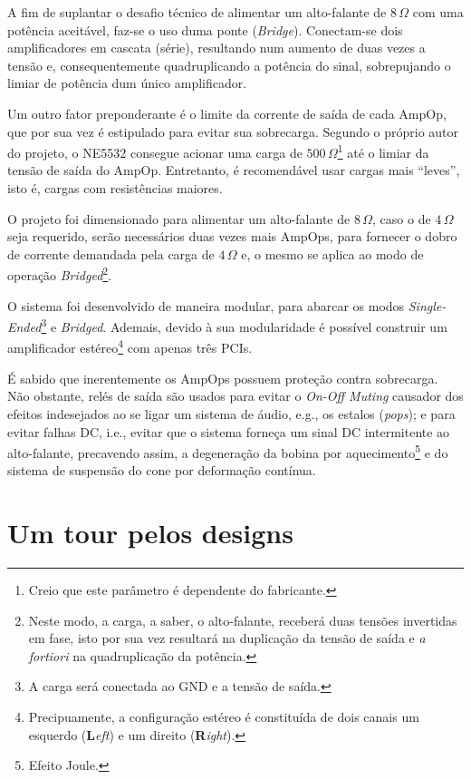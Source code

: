 \documentclass[12pt, a4paper, leqno, twoside]{book}
\def\ohm{\,\Omega}
\def\ampop{AmpOp}
\begin{document}
  A fim de suplantar o desafio t\'ecnico de alimentar um alto-falante de $8\ohm$ com uma pot\^encia aceit\'avel, faz-se o uso duma ponte ({\it Bridge}). Conectam-se dois amplificadores em cascata (s\'erie), resultando num aumento de duas vezes a tens\~ao e, consequentemente quadruplicando a pot\^encia do sinal, sobrepujando o limiar de pot\^encia dum \'unico amplificador. 

  Um outro fator preponderante \'e o limite da corrente de sa\'ida de cada \ampop, que por sua vez \'e estipulado para evitar sua sobrecarga. Segundo o pr\'oprio autor do projeto, o NE5532 consegue acionar uma carga de $500\ohm$\footnote{Creio que este par\^ametro \'e dependente do fabricante.} at\'e o limiar da tens\~ao de sa\'ida do \ampop. Entretanto, \'e recomend\'avel usar cargas mais ``leves'', isto \'e, cargas com resist\^encias maiores. 

  O projeto foi dimensionado para alimentar um alto-falante de $8\ohm$, caso o de $4\ohm$ seja requerido, ser\~ao necess\'arios duas vezes mais \ampop{s}, para fornecer o dobro de corrente demandada pela carga de $4\ohm$ e, o mesmo se aplica ao modo de opera\c c\~ao {\it Bridged\/}\footnote{Neste modo, a carga, a saber, o alto-falante, receber\'a duas tens\~oes invertidas em fase, isto por sua vez resultar\'a na duplica\c c\~ao da tens\~ao de sa\'ida e {\it a fortiori} na quadruplica\c c\~ao da pot\^encia.}. 

  O sistema foi desenvolvido de maneira modular, para abarcar os modos {\it Single-Ended\/}\footnote{A carga ser\'a conectada ao GND e a tens\~ao de sa\'ida.} e {\it Bridged}. Ademais, devido \`a sua modularidade \'e poss\'ivel construir um amplificador est\'ereo\footnote{Precipuamente, a configura\c c\~ao est\'ereo \'e constitu\'ida de dois canais um esquerdo ({\bf L}{\it eft}) e um direito ({\bf R}{\it ight}).} com apenas tr\^es PCIs.

  \'E sabido que inerentemente os \ampop{s} possuem prote\c c\~ao contra sobrecarga. N\~ao obstante, rel\'es de sa\'ida s\~ao usados para evitar o {\it On-Off Muting} causador dos efeitos indesejados ao se ligar um sistema de \'audio, e.g., os estalos ({\it pops}); e para evitar falhas DC, i.e., evitar que o sistema forneça um sinal DC intermitente ao alto-falante, precavendo assim, a degenera\c c\~ao da bobina por aquecimento\footnote{Efeito Joule.} e do sistema de suspens\~ao do cone por deforma\c c\~ao cont\'inua. 
  \section{Um tour pelos designs}
\end{document}
